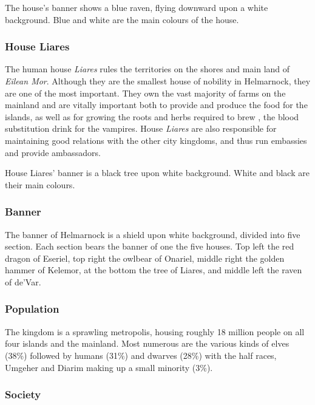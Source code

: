 The house's banner shows a blue raven, flying downward upon a white
background.  Blue and white are the main colours of the house.

\subsubsection{House Liares}
\label{sec:House Liares}

The human house \emph{Liares} rules the territories on the shores and main
land of \emph{Eilean Mor}. Although they are the smallest house of nobility in
Helmarnock, they are one of the most important. They own the vast majority of
farms on the mainland and are vitally important both to provide and produce
the food for the islands, as well as for growing the roots and herbs required
to brew , the blood substitution drink for the
vampires. House \emph{Liares} are also responsible for maintaining good
relations with the other city kingdoms, and thus run embassies and provide
ambassadors.

House Liares' banner is a black tree upon white background. White and black
are their main colours.

\subsubsection{Banner}

The banner of Helmarnock is a shield upon white background, divided into five
section. Each section bears the banner of one the five houses. Top left the
red dragon of Eseriel, top right the owlbear of Onariel, middle right the
golden hammer of Kelemor, at the bottom the tree of Liares, and middle left
the raven of de'Var.

\subsubsection{Population}

The kingdom is a sprawling metropolis, housing roughly 18 million people on
all four islands and the mainland. Most numerous are the various kinds of
elves (38\%) followed by humans (31\%) and dwarves (28\%) with the half
races, Umgeher and Diarim making up a small minority (3\%).

\subsubsection{Society}

